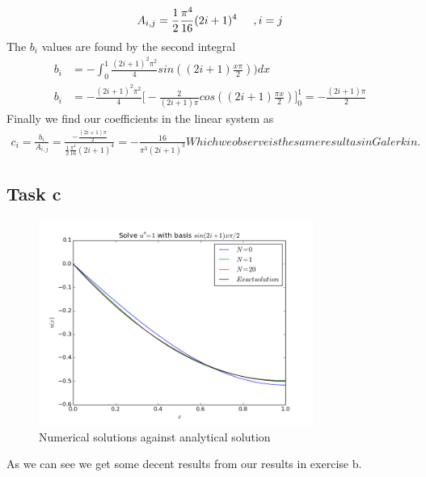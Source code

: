 \documentclass[a4paper,norsk]{article}
\begin{document}
\[ A_{i,j} = \frac{1}{2}\frac{\pi^4}{16}(2i+1)^4 \hspace{5mm} ,i = j \]
The $b_i$ values are found by the second integral
\begin{align*}
b_i &= -\int_0^1 \frac{(2i+1)^2\pi^2}{4} sin((2i+1)\frac{x\pi}{2})) dx \\
b_i &= - \frac{(2i+1)^2\pi^2}{4} \Big[-\frac{2}{(2i+1)\pi}cos((2i+1)\frac{\pi x}{2}) \Big]_0^1 =
-\frac{(2i+1)\pi}{2}
\end{align*}
Finally we find our coefficients in the linear system as 
\begin{align*}
c_i = \frac{b_i}{A_{i,j}} = \frac{-\frac{(2i+1)\pi}{2}}{\frac{1}{2}\frac{\pi^4}{16}(2i+1)^4}
= -\frac{16}{\pi^3(2i+1)^3}
Which we observe is the same result as in Galerkin.
\end{align*}
\subsection*{Task c}

\begin{figure}[h!]
  \caption{Numerical solutions against analytical solution}
  \centering
    \includegraphics[width=0.8\textwidth]{Taskc.png}
\end{figure}
As we can see we get some decent results from our results in exercise b.
\end{document}

